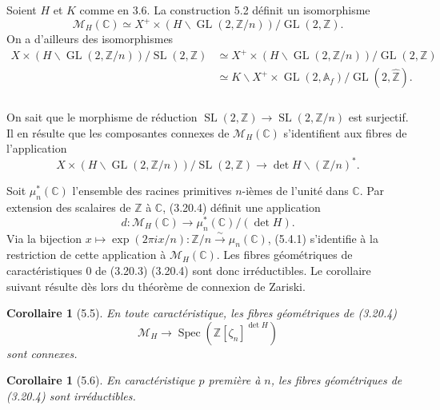\documentclass[11pt,a4paper]{amsart}
\theoremstyle{plain}
\newtheorem{corollary}[theorem]{Corollaire}
\theoremstyle{definition}
\DeclareMathOperator{\Spec}{Spec}
\DeclareMathOperator{\Gl}{GL}
\DeclareMathOperator{\SL}{SL}
\newcommand{\CC}{\mathbb{C}}
\newcommand{\CM}{\mathcal{M}}
\newcommand{\mll}{\mathcal{M}}
\newcommand{\ZZ}{\mathbb{Z}}
\newcommand{\Af}{\mathbb{A}}
\begin{document}
\subsubsection{}
Soient $H$ et $K$ comme en 3.6. La construction 5.2 d\'efinit un isomorphisme
\[
\mll_H(\CC) \simeq X^+ \times (H \backslash \Gl(2, \ZZ/n)) / \Gl(2, \ZZ).
\]
On a d'ailleurs des isomorphismes
\begin{align*}
X \times (H \backslash \Gl(2, \ZZ/n)) / \SL(2, \ZZ) & \simeq X^+ \times (H \backslash \Gl(2, \ZZ/n)) / \Gl(2, \ZZ) \\
& \simeq K \backslash X^+ \times \Gl(2, \Af_f) / \Gl(2, \hat{\ZZ}).
\end{align*}

\subsubsection{}
On sait que le morphisme de r\'eduction $\SL(2, \ZZ) \to \SL(2, \ZZ/n)$ est surjectif. Il en r\'esulte que les composantes connexes de $\mll_H(\CC)$ s'identifient aux fibres de l'application
\begin{equation}\label{eq:5.4.0}
X \times (H \backslash \Gl(2, \ZZ/n)) / \SL(2, \ZZ) \longrightarrow \det H \backslash (\ZZ/n)^*.
\end{equation}

Soit $\mu_n^*(\CC)$ l'ensemble des racines primitives $n$-i\`emes de l'unit\'e dans $\CC$. Par extension des scalaires de $\ZZ$ \`a $\CC$, (3.20.4) d\'efinit une application
\begin{equation}\label{eq:5.4.1}
d \colon \mll_H(\CC) \longrightarrow \mu_n^*(\CC)/(\det H).
\end{equation}
Via la bijection $x \mapsto \exp(2\pi ix/n): \ZZ/n \xrightarrow{\sim} \mu_n(\CC)$, (5.4.1) s'identifie \`a la restriction de cette application \`a $\mll_H(\CC)$. Les fibres g\'eom\'etriques de caract\'eristiques $0$ de (3.20.3) (3.20.4) sont donc irr\'eductibles. Le corollaire suivant r\'esulte d\`es lors du th\'eor\`eme de connexion de Zariski.

\begin{corollary}[5.5]
En toute caract\'eristique, les fibres g\'eom\'etriques de (3.20.4)
\[
\CM_H \longrightarrow \Spec(\ZZ[\zeta_n]^{\det H})
\]
sont connexes.
\end{corollary}

\begin{corollary}[5.6]
En caract\'eristique $p$ premi\`ere \`a $n$, les fibres g\'eom\'etriques de (3.20.4) sont irr\'eductibles.
\end{corollary}
\end{document}
